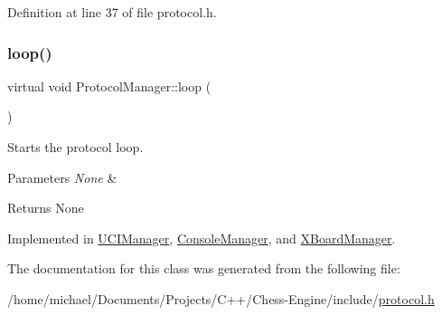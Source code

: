 Definition at line 37 of file protocol.\+h.

\mbox{\label{classProtocolManager_aa3ae25a03e2f070ea486fd9319715a6a}} 
\subsubsection{\texorpdfstring{loop()}{loop()}}
{\footnotesize\ttfamily virtual void Protocol\+Manager\+::loop (\begin{DoxyParamCaption}{ }\end{DoxyParamCaption})\hspace{0.3cm}{\ttfamily [pure virtual]}}



Starts the protocol loop. 


\begin{DoxyParams}{Parameters}
{\em None} & \\
\hline
\end{DoxyParams}
\begin{DoxyReturn}{Returns}
None 
\end{DoxyReturn}


Implemented in \mbox{\hyperlink{classUCIManager_aa2fa2a352e6d58f00c8388da0d8541e1}{U\+C\+I\+Manager}}, \mbox{\hyperlink{classConsoleManager_a69261543a87cf7d3c7ec004c566145fd}{Console\+Manager}}, and \mbox{\hyperlink{classXBoardManager_a7d59ec1b3eaf1d140ad8f7cacd2ae956}{X\+Board\+Manager}}.



The documentation for this class was generated from the following file\+:\begin{DoxyCompactItemize}
\item 
/home/michael/\+Documents/\+Projects/\+C++/\+Chess-\/\+Engine/include/\mbox{\hyperlink{protocol_8h}{protocol.\+h}}\end{DoxyCompactItemize}
